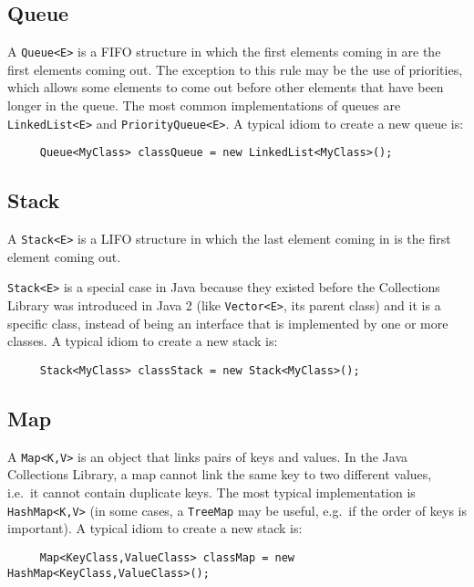 \subsection{Queue}
\label{sec:queue}

A \verb+Queue<E>+ is a FIFO structure in which the first elements coming
in are the first elements coming out. The exception to this rule may
be the use of priorities, which allows some elements to come out
before other elements that have been longer in the queue. The most
common implementations of queues are \verb+LinkedList<E>+ and
\verb+PriorityQueue<E>+. A typical idiom to
create a new queue is:

\begin{verbatim}
     Queue<MyClass> classQueue = new LinkedList<MyClass>();
\end{verbatim}

\subsection{Stack}
\label{sec:stack}

A \verb+Stack<E>+ is a LIFO structure in which the last element coming in
is the first element coming out. 

\verb+Stack<E>+ is a special case in Java because they existed before the
Collections Library was introduced in Java 2 (like \verb+Vector<E>+, its
parent class) and it is a specific class, instead of being an
interface that is implemented by one or more classes. A typical idiom to
create a new stack is:

\begin{verbatim}
     Stack<MyClass> classStack = new Stack<MyClass>();
\end{verbatim}

\subsection{Map}
\label{sec:maps}

A \verb+Map<K,V>+ is an object that links pairs of keys and values. In
the Java Collections Library, a map cannot link the same key to two
different values, i.e.~it cannot contain duplicate keys. The most
typical implementation is \verb+HashMap<K,V>+ (in some cases, a
\verb+TreeMap+ may be useful, e.g.~if the order of keys is
important). A typical idiom to
create a new stack is:

\begin{verbatim}
     Map<KeyClass,ValueClass> classMap = new HashMap<KeyClass,ValueClass>();
\end{verbatim}



